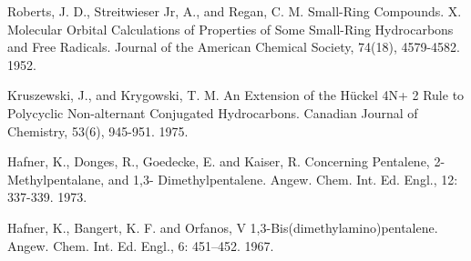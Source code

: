 \documentclass[12pt]{article}
\begin{document}
\begin{thebibliography}{abrv}
 Roberts, J. D., Streitwieser Jr, A., and Regan, C. M. Small-Ring Compounds. X. Molecular Orbital Calculations of Properties of Some Small-Ring Hydrocarbons and Free Radicals. Journal of the American Chemical Society, 74(18), 4579-4582. 1952.

 Kruszewski, J., and Krygowski, T. M. An Extension of the Hückel 4N+ 2 Rule to Polycyclic Non-alternant Conjugated Hydrocarbons. Canadian Journal of Chemistry, 53(6), 945-951. 1975.

 Hafner, K., Donges, R., Goedecke, E. and 
Kaiser, R. Concerning Pentalene, 2-Methylpentalane, and 1,3-
Dimethylpentalene. Angew. Chem. Int. Ed. Engl., 12: 337-339. 1973.

 Hafner, K., Bangert, K. F. and Orfanos, V 1,3-Bis(dimethylamino)pentalene. Angew. Chem. Int. Ed. Engl., 6: 451–452. 1967.

\end{thebibliography}
\end{document}
